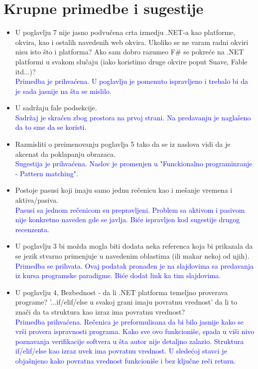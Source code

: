 \documentclass[a4paper]{report}
\newcommand{\odgovor}[1]{\textcolor{blue}{#1}}
\begin{document}
\section{Krupne primedbe i sugestije}
\begin{itemize}
    \item U poglavlju 7 nije jasno podvučena crta izmedju .NET-a kao platforme, okvira, kao i ostalih navedenih web okvira. Ukoliko se ne varam radni okviri nisu isto što i platforma? Ako sam dobro razumeo F\# se pokreće na .NET platformi u svakom slučaju (iako koristimo druge okvire poput Suave, Fable itd...)?
      \\  \odgovor {Primedba je prihvaćena. U poglavlju je pomenuto ispravljeno i trebalo bi da je sada jasnije na šta se mislilo.}
    \item U sadržaju fale podsekcije. \\ \odgovor{Sadržaj je skraćen zbog prostora na prvoj strani. Na predavanju je naglašeno da to sme da se koristi.}
    \item Razmisliti o preimenovanju poglavlja 5 tako da se iz naslova vidi da je akcenat da poklapanju obrazaca. \\ 
    \odgovor {Sugestija je prihvaćena. Naslov je promenjen u "Funckionalno programinranje - Pattern matching".}
    \item Postoje pasusi koji imaju samo jednu rečenicu kao i mešanje vremena i aktiva/pasiva. 
    \\ \odgovor{Pasusi sa jednom rečenicom su prepravljeni. Problem sa aktivom i pasivom nije konkretno naveden gde se javlja. Biće ispravljen kod sugestije drugog recenzenta.}
    \item U poglavlju 3 bi možda mogla biti dodata neka referenca koja bi prikazala da se jezik stvarno primenjuje u navedenim oblastima (ili makar nekoj od njih).
   \\ \odgovor{Primedba se prihvata. Ovaj podatak pronađen je na slajdovima sa predavanja iz kursa programske paradigme. Biće dodat link ka tim slajdovima.}
    \item U poglavlju 4, Bezbednost - da li .NET platforma temeljno proverava programe? '...if/elif/else u svakoj grani imaju povratnu vrednost' da li to znači da ta struktura kao izraz ima povratnu vrednost?
    \\ \odgovor{Primedba prihvaćena. Rečenica je preformulisana da bi bilo jasnije kako se vrši provera ispravnosti programa. Kako sve ovo funkcioniše, spada u viši nivo poznavanja verifikacije softvera u šta autor nije detaljno zalazio.
    Struktura if/elif/else kao izraz uvek ima povratnu vrednost. U sledećoj stavci je objašnjeno kako povratna vrednost funkcioniše i bez ključne reči return. }
    

\end{itemize}
\end{document}

